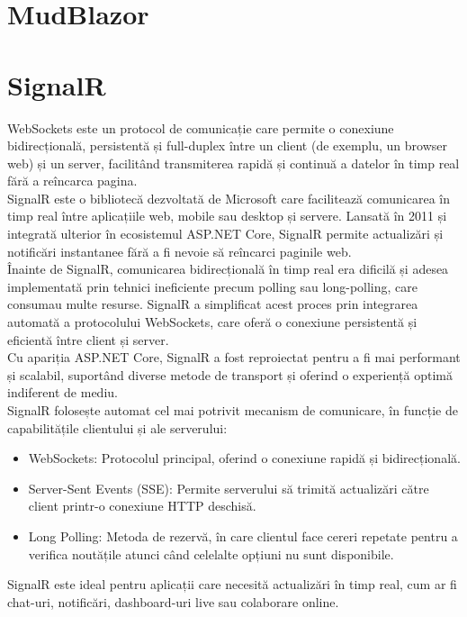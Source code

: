 \section{MudBlazor}

\section{SignalR}
 {\hspace*{1cm}WebSockets este un protocol de comunicație care permite o conexiune bidirecțională, persistentă și full-duplex între un client (de exemplu, un browser web) și un server, facilitând transmiterea rapidă și continuă a datelor în timp real fără a reîncarca pagina.}\parencite{signalR}\\
{\hspace*{1cm} SignalR este o bibliotecă dezvoltată de Microsoft care facilitează comunicarea în timp real între aplicațiile web, mobile sau desktop și servere. Lansată în 2011 și integrată ulterior în ecosistemul ASP.NET Core, SignalR permite actualizări și notificări instantanee fără a fi nevoie să reîncarci paginile web.}\parencite{signalR}\\
{Înainte de SignalR, comunicarea bidirecțională în timp real era dificilă și adesea implementată prin tehnici ineficiente precum polling sau long-polling, care consumau multe resurse. SignalR a simplificat acest proces prin integrarea automată a protocolului WebSockets, care oferă o conexiune persistentă și eficientă între client și server.}\parencite{signalR}\\
{Cu apariția ASP.NET Core, SignalR a fost reproiectat pentru a fi mai performant și scalabil, suportând diverse metode de transport și oferind o experiență optimă indiferent de mediu.}\parencite{signalR}\\
{SignalR folosește automat cel mai potrivit mecanism de comunicare, în funcție de capabilitățile clientului și ale serverului:}
\begin{itemize}
    \item WebSockets: Protocolul principal, oferind o conexiune rapidă și bidirecțională.
    \item Server-Sent Events (SSE): Permite serverului să trimită actualizări către client printr-o conexiune HTTP deschisă.
    \item Long Polling: Metoda de rezervă, în care clientul face cereri repetate pentru a verifica noutățile atunci când celelalte opțiuni nu sunt disponibile.
\end{itemize}\parencite{signalR}
{SignalR este ideal pentru aplicații care necesită actualizări în timp real, cum ar fi chat-uri, notificări, dashboard-uri live sau colaborare online.}
